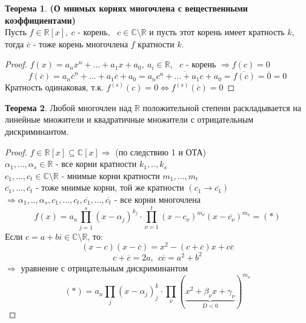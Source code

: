 \documentclass[a4paper, 12pt]{article}
\newcommand{\R}{\mathbb R}
\theoremstyle{definition}
\newtheorem*{theorem}{Теорема}
\begin{document}
  \begin{theorem}\textbf{(О мнимых корнях многочлена с вещественными коэффициентами)} \\
    Пусть $f \in \R[x], \ c$ - корень, \ $c \in \mathbb{C}\setminus \R$ и пусть этот корень имеет кратность $k$, тогда $\overline{c}$ - тоже корень многочлена $f$ кратности $k$.     
  \end{theorem} 
  \begin{proof}
    $f(x) = a_nx^n+...+a_1x+a_0, \ a_i \in \R$, \ $c$ - корень $\Longrightarrow f(c) =0$  
    $$f(\overline{c}) = a_n\overline{c}^n+...+a_1\overline{c}+a_0 = \overline{a_nc^n+...+a_1c+a_0} = \overline{f(c)} = \overline{0} = 0$$
    Кратность одинаковая, т.к. $f^{(s)}(c)=0 \Longleftrightarrow f^{(s)}( \overline{c})=0$ 
  \end{proof}
  \begin{theorem}
    Любой многочлен над $\R$ положительной степени раскладывается на линейные множители и квадратичные множители с отрицательным дискриминантом.
  \end{theorem}
  \begin{proof}
    $f\in \R[x] \subseteq \mathbb{C}[x] \Longrightarrow $ (по следствию 1 и ОТА) \\
    $\alpha_1,...,\alpha_s \in \R$ - все корни кратности $k_1,..,k_s$\\
    $c_1,...,c_t \in \mathbb{C}\setminus \R$ - мнимые корни кратности $m_1,...,m_t$\\
    $\overline{c_1},...,\overline{c_t}$ - тоже мнимые корни, той же кратности $(c_1 \to \overline{c_1})$\\
    $\Longrightarrow \alpha_1,..,\alpha_s,c_1,...,c_t,\overline{c_1},...,\overline{c_t}$ - все корни многочлена
    $$f(x) = a_n \prod\limits_{j=1}^{s}(x-\alpha_j)^{k_j} \cdot \prod\limits_{\nu=1}^{t}(x-c_{\nu})^{m_\nu}(x-\overline{c_{\nu}})^{m_\nu} = (*)$$
    Если $c=a+bi \in \mathbb{C}\setminus \R$, то:
    $$(x-c)(x-\overline{c}) = x^2 - (c+\overline{c})x + c \overline{c}$$
    $$c+\overline{c} = 2a, \ \ c \overline{c} = a^2 + b^2$$
    $\Longrightarrow $ уравнение с отрицательным дискриминантом    
    $$(*) = a_n \prod\limits_{j}(x-\alpha_j)^k_j \cdot \prod\limits_{\nu}(\underbrace{x^2+\beta_{\nu}x+ \gamma_{\nu}}_{D<0})^{m_\nu} $$    
  \end{proof}
\end{document}

